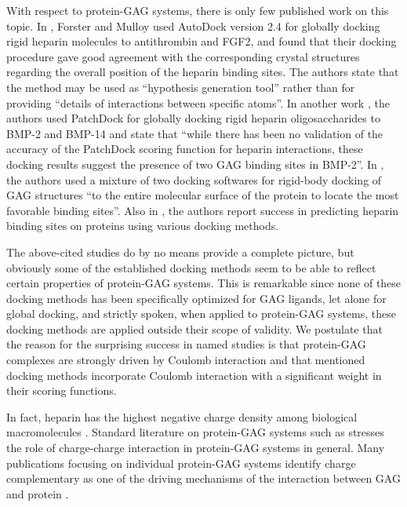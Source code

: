 With respect to protein-GAG systems, there is only few published work on this
topic. In \cite{hp_binding_sites_mulloy_2006}, Forster and Mulloy used AutoDock
version 2.4 \cite{autodock24} for globally docking rigid heparin molecules to
antithrombin and FGF2, and found that their docking procedure gave good
agreement with the corresponding crystal structures regarding the overall
position of the heparin binding sites. The authors state that the method may be
used as \enquote{hypothesis generation tool} rather than for providing
\enquote{details of interactions between specific atoms}. In another work
\cite{gandhi_bmp_heparin_binding_sites_2012}, the authors used PatchDock
\cite{patchdock_2002} for globally docking rigid heparin oligosaccharides to
BMP-2 and BMP-14 and state that \enquote{while there has been no validation of
the accuracy of the PatchDock scoring function for heparin interactions, these
docking results suggest the presence of two GAG binding sites in BMP-2}. In
\cite{rogers_gag_prot_prot_2011}, the authors used a mixture of two docking
softwares for rigid-body docking of GAG structures \enquote{to the entire
molecular surface of the protein to locate the most favorable binding sites}.
Also in \cite{bitomsky_gag_docking_1999}, the authors report success in
predicting heparin binding sites on proteins using various docking methods.

The above-cited studies do by no means provide a complete picture, but obviously
some of the established docking methods seem to be able to reflect certain
properties of protein-GAG systems. This is remarkable since none of these
docking methods has been specifically optimized for GAG ligands, let alone for
global docking, and strictly spoken, when applied to protein-GAG systems, these
docking methods are applied outside their scope of validity. We postulate that
the reason for the surprising success in named studies is that protein-GAG
complexes are strongly driven by Coulomb interaction and that mentioned docking
methods incorporate Coulomb interaction with a significant weight in their
scoring functions.

In fact, heparin has the highest negative charge density among biological
macromolecules \cite{capila_linhardt_hep_prot_2002}. Standard literature on
protein-GAG systems such as
\cite{essentials_glycobiology_gags_2009,gandhi_structure_2008} stresses the
role of charge-charge interaction in protein-GAG systems in general. Many
publications focusing on individual protein-GAG systems identify charge
complementary as one of the driving mechanisms of the interaction between GAG
and protein
\cite{gandhi_bmp_heparin_binding_sites_2012,faham_heparin_1996,%
pichert_characterization_2012,rogers_gag_prot_prot_2011}.

